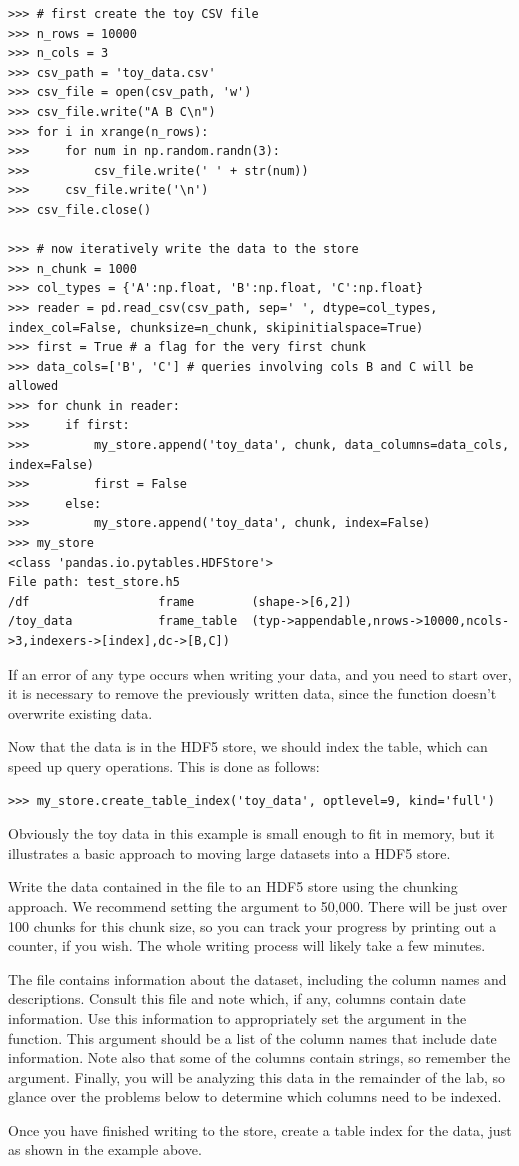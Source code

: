 \begin{lstlisting}
>>> # first create the toy CSV file
>>> n_rows = 10000
>>> n_cols = 3
>>> csv_path = 'toy_data.csv'
>>> csv_file = open(csv_path, 'w')
>>> csv_file.write("A B C\n")
>>> for i in xrange(n_rows):
>>>     for num in np.random.randn(3):
>>>         csv_file.write(' ' + str(num))
>>>     csv_file.write('\n')
>>> csv_file.close()

>>> # now iteratively write the data to the store
>>> n_chunk = 1000
>>> col_types = {'A':np.float, 'B':np.float, 'C':np.float}
>>> reader = pd.read_csv(csv_path, sep=' ', dtype=col_types, index_col=False, chunksize=n_chunk, skipinitialspace=True)
>>> first = True # a flag for the very first chunk
>>> data_cols=['B', 'C'] # queries involving cols B and C will be allowed
>>> for chunk in reader:
>>>     if first:
>>>         my_store.append('toy_data', chunk, data_columns=data_cols, index=False)
>>>         first = False
>>>     else:
>>>         my_store.append('toy_data', chunk, index=False)
>>> my_store
<class 'pandas.io.pytables.HDFStore'>
File path: test_store.h5
/df                  frame        (shape->[6,2])
/toy_data            frame_table  (typ->appendable,nrows->10000,ncols->3,indexers->[index],dc->[B,C])
\end{lstlisting}
If an error of any type occurs when writing your data, and you need to start over, it is necessary to remove
the previously written data, since the  function doesn't overwrite existing data.

Now that the data is in the HDF5 store, we should index the table, which can speed up query operations.
This is done as follows:
\begin{lstlisting}
>>> my_store.create_table_index('toy_data', optlevel=9, kind='full')
\end{lstlisting}
Obviously the toy data in this example is small enough to fit in memory, but it illustrates a basic approach
to moving large datasets into a HDF5 store.

\begin{problem}
Write the data contained in the file  to an HDF5 store using the chunking approach.
We recommend setting the  argument to 50,000. There will be just over 100 chunks for this
chunk size, so you can track your progress by printing out a counter, if you wish. The whole writing
process will likely take a few minutes.

The file  contains information about the dataset, including the column names and descriptions.
Consult this file and note which, if any, columns contain date information. Use this information to appropriately
set the  argument in the  function. This argument should be a list of the column names
that include date information. Note also that some of the columns contain strings, so remember the 
 argument. Finally, you will be analyzing this data in the remainder of the lab, so glance over 
the problems below to determine which columns need to be indexed. 

Once you have finished writing to the store, create a table index for the data, just as shown in the example above.
\end{problem}

